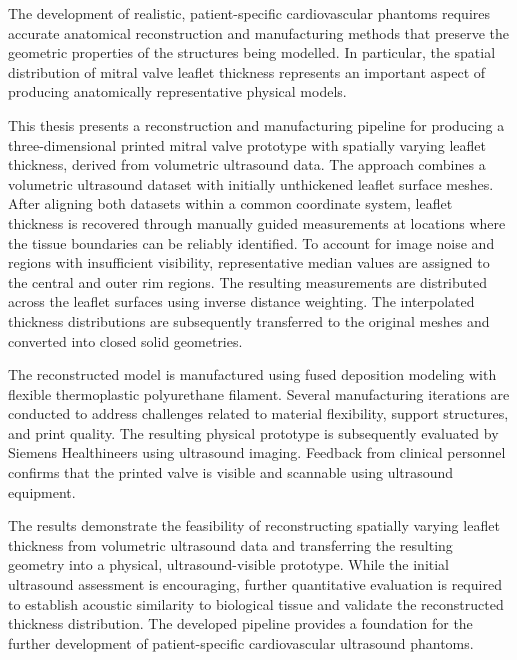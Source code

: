 The development of realistic, patient-specific cardiovascular phantoms requires accurate anatomical reconstruction and manufacturing methods that preserve the geometric properties of the structures being modelled. In particular, the spatial distribution of mitral valve leaflet thickness represents an important aspect of producing anatomically representative physical models.

This thesis presents a reconstruction and manufacturing pipeline for producing a three-dimensional printed mitral valve prototype with spatially varying leaflet thickness, derived from volumetric ultrasound data. The approach combines a volumetric ultrasound dataset with initially unthickened leaflet surface meshes. After aligning both datasets within a common coordinate system, leaflet thickness is recovered through manually guided measurements at locations where the tissue boundaries can be reliably identified. To account for image noise and regions with insufficient visibility, representative median values are assigned to the central and outer rim regions. The resulting measurements are distributed across the leaflet surfaces using inverse distance weighting. The interpolated thickness distributions are subsequently transferred to the original meshes and converted into closed solid geometries.

The reconstructed model is manufactured using fused deposition modeling with flexible thermoplastic polyurethane filament. Several manufacturing iterations are conducted to address challenges related to material flexibility, support structures, and print quality. The resulting physical prototype is subsequently evaluated by Siemens Healthineers using ultrasound imaging. Feedback from clinical personnel confirms that the printed valve is visible and scannable using ultrasound equipment.

The results demonstrate the feasibility of reconstructing spatially varying leaflet thickness from volumetric ultrasound data and transferring the resulting geometry into a physical, ultrasound-visible prototype. While the initial ultrasound assessment is encouraging, further quantitative evaluation is required to establish acoustic similarity to biological tissue and validate the reconstructed thickness distribution. The developed pipeline provides a foundation for the further development of patient-specific cardiovascular ultrasound phantoms.
